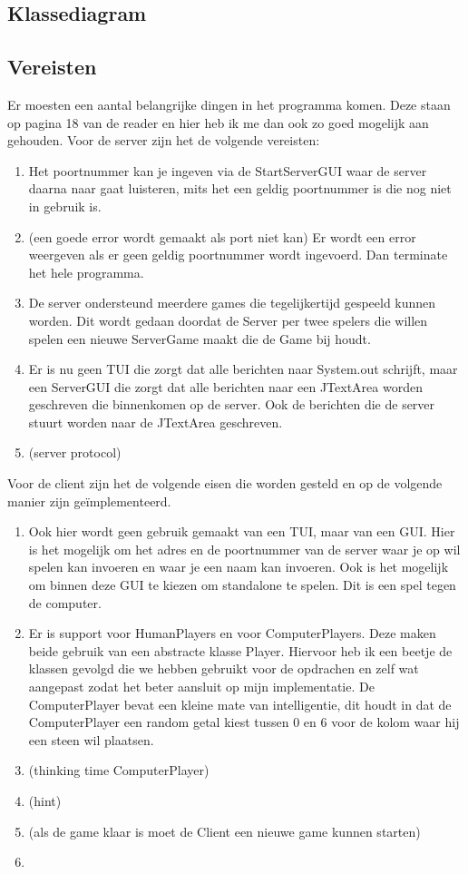 \documentclass[12pt]{article}
\begin{document}
\subsection{Klassediagram}

\subsection{Vereisten}
Er moesten een aantal belangrijke dingen in het programma komen. Deze staan op pagina 18 van de reader en hier heb ik me dan ook zo goed mogelijk aan gehouden.
Voor de server zijn het de volgende vereisten:
\begin{enumerate}
\item Het poortnummer kan je ingeven via de StartServerGUI waar de server daarna naar gaat luisteren, mits het een geldig poortnummer is die nog niet in gebruik is.
\item (een goede error wordt gemaakt als port niet kan) Er wordt een error weergeven als er geen geldig poortnummer wordt ingevoerd. Dan terminate het hele programma. 
\item De server ondersteund meerdere games die tegelijkertijd gespeeld kunnen worden. Dit wordt gedaan doordat de Server per twee spelers die willen spelen een nieuwe ServerGame maakt die de Game bij houdt.
\item Er is nu geen TUI die zorgt dat alle berichten naar System.out schrijft, maar een ServerGUI die zorgt dat alle berichten naar een JTextArea worden geschreven die binnenkomen op de server. Ook de berichten die de server stuurt worden naar de JTextArea geschreven.
\item (server protocol)
\end{enumerate}
Voor de client zijn het de volgende eisen die worden gesteld en op de volgende manier zijn ge\"implementeerd.
\begin{enumerate}
 \item Ook hier wordt geen gebruik gemaakt van een TUI, maar van een GUI. Hier is het mogelijk om het adres en de poortnummer van de server waar je op wil spelen kan invoeren en waar je een naam kan invoeren. Ook is het mogelijk om binnen deze GUI te kiezen om standalone te spelen. Dit is een spel tegen de computer.
 \item Er is support voor HumanPlayers en voor ComputerPlayers. Deze maken beide gebruik van een abstracte klasse Player. Hiervoor heb ik een beetje de klassen gevolgd die we hebben gebruikt voor de opdrachen en zelf wat aangepast zodat het beter aansluit op mijn implementatie. De ComputerPlayer bevat een kleine mate van intelligentie, dit houdt in dat de ComputerPlayer een random getal kiest tussen 0 en 6 voor de kolom waar hij een steen wil plaatsen.
 \item (thinking time ComputerPlayer)
 \item (hint)
 \item (als de game klaar is moet de Client een nieuwe game kunnen starten)
 \item 
\end{enumerate}
\end{document}
